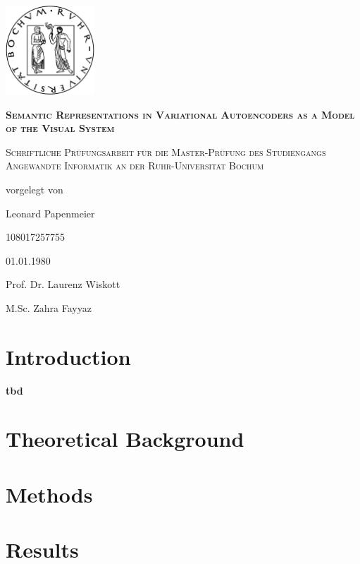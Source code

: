 \documentclass[11pt]{article}
\newcounter{savepage}
\begin{document}
\begin{titlepage}
\centering
\includegraphics[width=0.25\textwidth]{rublogo.png}\par
{\scshape\huge\bfseries Semantic Representations in Variational Autoencoders as a Model of the Visual System \par}
{\scshape\large Schriftliche Prüfungsarbeit für die Master-Prüfung des Studiengangs Angewandte Informatik an der Ruhr-Universität Bochum\par}
\vspace{1em}
vorgelegt von\par
\vspace{2em}
Leonard Papenmeier\par 108017257755\par
\vspace{2em}
01.01.1980\par

\vfill
Prof. Dr. Laurenz Wiskott\par
M.Sc. Zahra Fayyaz


\end{titlepage}
\tableofcontents
\newpage


    \section{Introduction}\label{sec:introduction}

    \textbf{tbd}


    \section{Theoretical Background}\label{sec:theoretical-background}
    


    \section{Methods}\label{sec:methods}
    


    \section{Results}\label{sec:results}
    
\end{document}
